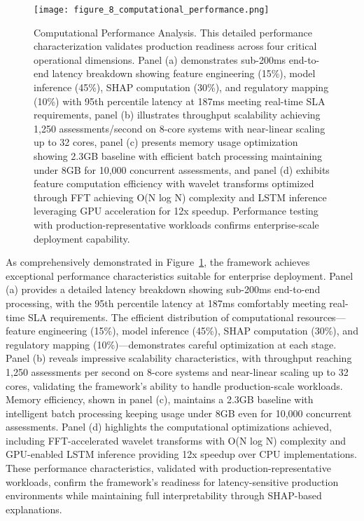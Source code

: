 \documentclass[a4paper,11pt,twoside]{article}
\newcommand{\0}{\Bf{0}}
\theoremstyle{definition}
\begin{document}
\begin{figure}[H]
\centering
\texttt{[image: figure\_8\_computational\_performance.png]}
\caption{Computational Performance Analysis. This detailed performance characterization validates production readiness across four critical operational dimensions. Panel (a) demonstrates sub-200ms end-to-end latency breakdown showing feature engineering (15\%), model inference (45\%), SHAP computation (30\%), and regulatory mapping (10\%) with 95th percentile latency at 187ms meeting real-time SLA requirements, panel (b) illustrates throughput scalability achieving 1,250 assessments/second on 8-core systems with near-linear scaling up to 32 cores, panel (c) presents memory usage optimization showing 2.3GB baseline with efficient batch processing maintaining under 8GB for 10,000 concurrent assessments, and panel (d) exhibits feature computation efficiency with wavelet transforms optimized through FFT achieving O(N log N) complexity and LSTM inference leveraging GPU acceleration for 12x speedup. Performance testing with production-representative workloads confirms enterprise-scale deployment capability.}
\label{fig:computational_performance}
\end{figure}

As comprehensively demonstrated in Figure~\ref{fig:computational_performance}, the framework achieves exceptional performance characteristics suitable for enterprise deployment. Panel (a) provides a detailed latency breakdown showing sub-200ms end-to-end processing, with the 95th percentile latency at 187ms comfortably meeting real-time SLA requirements. The efficient distribution of computational resources—feature engineering (15\%), model inference (45\%), SHAP computation (30\%), and regulatory mapping (10\%)—demonstrates careful optimization at each stage. Panel (b) reveals impressive scalability characteristics, with throughput reaching 1,250 assessments per second on 8-core systems and near-linear scaling up to 32 cores, validating the framework's ability to handle production-scale workloads. Memory efficiency, shown in panel (c), maintains a 2.3GB baseline with intelligent batch processing keeping usage under 8GB even for 10,000 concurrent assessments. Panel (d) highlights the computational optimizations achieved, including FFT-accelerated wavelet transforms with O(N log N) complexity and GPU-enabled LSTM inference providing 12x speedup over CPU implementations. These performance characteristics, validated with production-representative workloads, confirm the framework's readiness for latency-sensitive production environments while maintaining full interpretability through SHAP-based explanations.
\end{document}
